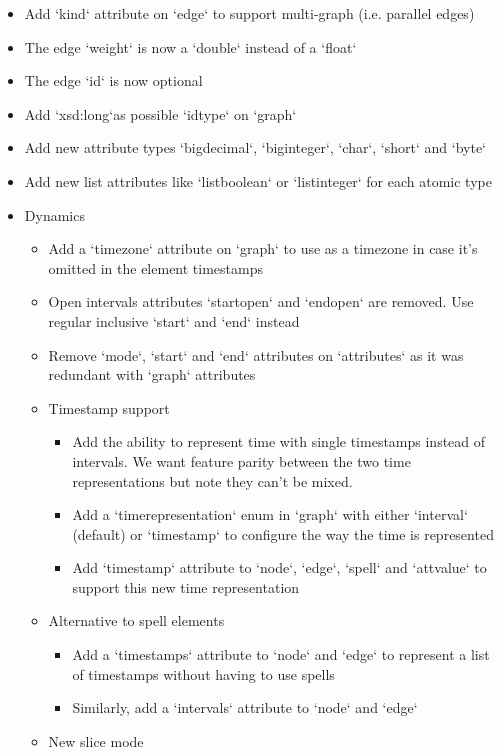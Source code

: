 \documentclass[a4paper,10pt]{article}
\begin{document}
\begin{itemize}
\item Add `kind` attribute on `edge` to support multi-graph (i.e. parallel edges)
\item The edge `weight` is now a `double` instead of a `float`
\item The edge `id` is now optional
\item Add `xsd:long`as possible `idtype` on `\<graph\>`
\item Add new attribute types `bigdecimal`, `biginteger`, `char`, `short` and `byte`
\item Add new list attributes like `listboolean` or `listinteger` for each atomic type
\item Dynamics
\begin{itemize}
\item Add a `timezone` attribute on `\<graph\>` to use as a timezone in case it's omitted in the element timestamps
\item Open intervals attributes `startopen` and `endopen` are removed. Use regular inclusive `start` and `end` instead
\item Remove `mode`, `start` and `end` attributes on `\<attributes\>` as it was redundant with `\<graph\>` attributes
\item Timestamp support
\begin{itemize}
\item Add the ability to represent time with single timestamps instead of intervals. We want feature parity between the two time representations but note they can't be mixed.
\item Add a `timerepresentation` enum in `\<graph\>` with either `interval` (default) or `timestamp` to configure the way the time is represented
\item Add `timestamp` attribute to `\<node\>`, `\<edge\>`, `\<spell\>` and `\<attvalue\>` to support this new time representation
\end{itemize}
\item Alternative to spell elements
\begin{itemize}
\item Add a `timestamps` attribute to `\<node\>` and `\<edge\>` to represent a list of timestamps without having to use spells
\item Similarly, add a `intervals` attribute to `\<node\>` and `\<edge\>`
\end{itemize}
\item New slice mode
\begin{itemize}

\end{itemize}
\end{itemize}
\end{itemize}
\end{document}
